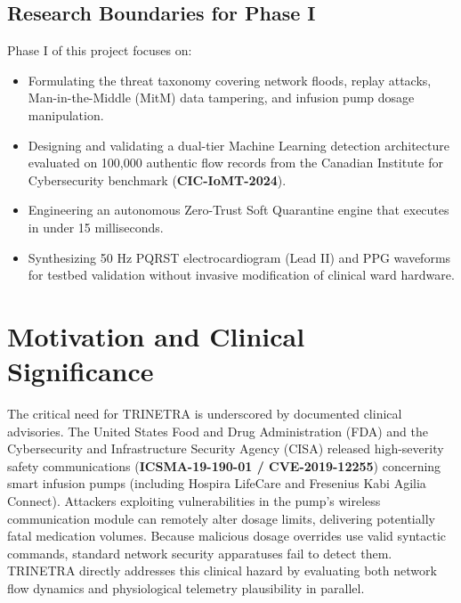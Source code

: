 \documentclass[12pt,a4paper]{report}
\begin{document}
\subsection{Research Boundaries for Phase I}
Phase I of this project focuses on:
\begin{itemize}
    \item Formulating the threat taxonomy covering network floods, replay attacks, Man-in-the-Middle (MitM) data tampering, and infusion pump dosage manipulation.
    \item Designing and validating a dual-tier Machine Learning detection architecture evaluated on 100,000 authentic flow records from the Canadian Institute for Cybersecurity benchmark (\textbf{CIC-IoMT-2024}).
    \item Engineering an autonomous Zero-Trust Soft Quarantine engine that executes in under 15 milliseconds.
    \item Synthesizing 50 Hz PQRST electrocardiogram (Lead II) and PPG waveforms for testbed validation without invasive modification of clinical ward hardware.
\end{itemize}

\section{Motivation and Clinical Significance}
The critical need for TRINETRA is underscored by documented clinical advisories. The United States Food and Drug Administration (FDA) and the Cybersecurity and Infrastructure Security Agency (CISA) released high-severity safety communications (\textbf{ICSMA-19-190-01 / CVE-2019-12255}) concerning smart infusion pumps (including Hospira LifeCare and Fresenius Kabi Agilia Connect). Attackers exploiting vulnerabilities in the pump's wireless communication module can remotely alter dosage limits, delivering potentially fatal medication volumes. Because malicious dosage overrides use valid syntactic commands, standard network security apparatuses fail to detect them. TRINETRA directly addresses this clinical hazard by evaluating both network flow dynamics and physiological telemetry plausibility in parallel.
\end{document}
